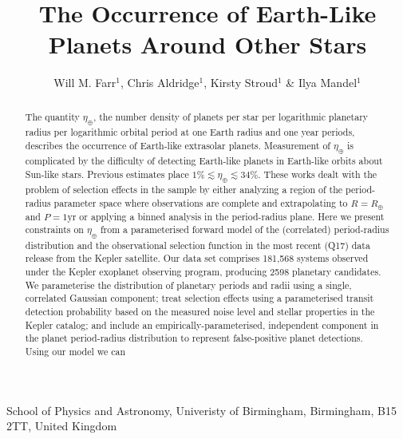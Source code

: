 \documentclass{nature}
\newcommand{\etaearth}{\eta_\oplus}
\newcommand{\REarth}{R_\oplus}
\begin{document}
\title{The Occurrence of Earth-Like Planets Around Other Stars}

\author{Will M. Farr$^{1}$, Chris Aldridge$^{1}$, Kirsty Stroud$^{1}$ \& Ilya Mandel$^{1}$}

\maketitle

\begin{affiliations}
\item School of Physics and Astronomy, Univeristy of Birmingham, Birmingham, B15 2TT, United Kingdom
\end{affiliations}

\begin{abstract}
  The quantity $\etaearth$, the number density of planets per star per
  logarithmic planetary radius per logarithmic orbital period at one
  Earth radius and one year periods, describes the occurrence of
  Earth-like extrasolar planets.  Measurement of $\etaearth$ is
  complicated by the difficulty of detecting Earth-like planets in
  Earth-like orbits about Sun-like stars.  Previous
  estimates\cite{2011ApJ...738..151C,2012ApJ...745...20T,2013ApJ...778...53D,2013PNAS..11019273P}
  place $1\% \lesssim \etaearth \lesssim 34\%$.  These works dealt
  with the problem of selection effects in the sample by either
  analyzing a region of the period-radius parameter space where
  observations are complete and extrapolating to $R = \REarth$ and $P
  = 1 \mathrm{yr}$\cite{2011ApJ...738..151C,2012ApJ...745...20T} or
  applying a binned analysis in the period-radius
  plane\cite{2013ApJ...778...53D,2013PNAS..11019273P}.  Here we
  present constraints on $\etaearth$ from a parameterised forward
  model of the (correlated) period-radius distribution and the
  observational selection function in the most recent (Q17) data
  release from the Kepler
  satellite\cite{2010Sci...327..977B,2011ApJ...736...19B,2013ApJS..204...24B}.
  Our data set comprises 181,568 systems observed under the Kepler
  exoplanet observing program, producing 2598 planetary candidates.
  We parameterise the distribution of planetary periods and radii
  using a single, correlated Gaussian component; treat selection
  effects using a parameterised transit detection probability based on
  the measured noise level and stellar properties in the Kepler
  catalog; and include an empirically-parameterised, independent
  component in the planet period-radius distribution to represent
  false-positive planet detections.  Using our model we can

\end{abstract}
\end{document}
